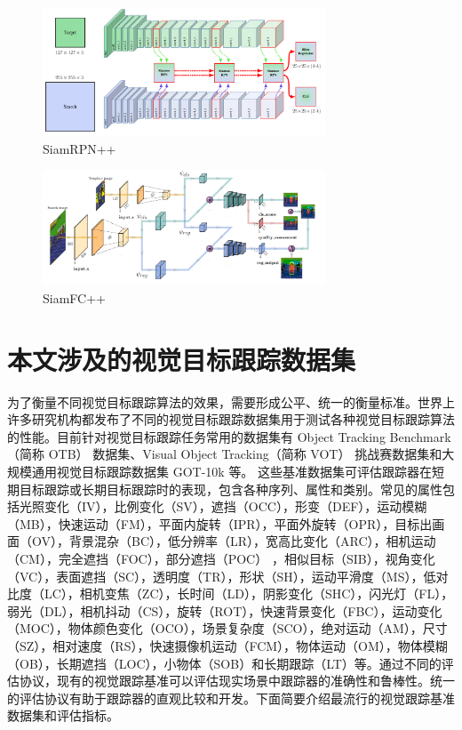\begin{figure}
\centering
\includegraphics[width=0.75\textwidth]{Img/related/SiamRPN++.png}
\caption{SiamRPN++}
\end{figure}

\begin{figure}
\centering
\includegraphics[width=0.75\textwidth]{Img/related/SiamFC++.png}
\caption{SiamFC++}
\end{figure}
\fi
\section{本文涉及的视觉目标跟踪数据集}
为了衡量不同视觉目标跟踪算法的效果，需要形成公平、统一的衡量标准。世界上许多研究机构都发布了不同的视觉目标跟踪数据集用于测试各种视觉目标跟踪算法的性能。目前针对视觉目标跟踪任务常用的数据集有 Object Tracking Benchmark（简称 OTB）\cite{OTB} 数据集、Visual Object Tracking（简称 VOT）\cite{VOT2015} 挑战赛数据集和大规模通用视觉目标跟踪数据集 GOT-10k \cite{GOT-10k} 等。
这些基准数据集可评估跟踪器在短期目标跟踪或长期目标跟踪时的表现，包含各种序列、属性和类别。常见的属性包括光照变化（IV），比例变化（SV），遮挡（OCC），形变（DEF），运动模糊（MB），快速运动（FM），平面内旋转（IPR），平面外旋转（OPR），目标出画面（OV），背景混杂（BC），低分辨率（LR），宽高比变化（ARC），相机运动（CM），完全遮挡（FOC），部分遮挡（POC） ，相似目标（SIB），视角变化（VC），表面遮挡（SC），透明度（TR），形状（SH），运动平滑度（MS），低对比度（LC），相机变焦（ZC），长时间（LD），阴影变化（SHC），闪光灯（FL），弱光（DL），相机抖动（CS），旋转（ROT），快速背景变化（FBC），运动变化（MOC），物体颜色变化（OCO），场景复杂度（SCO），绝对运动（AM），尺寸（SZ），相对速度（RS），快速摄像机运动（FCM），物体运动（OM），物体模糊（OB），长期遮挡（LOC），小物体（SOB）和长期跟踪（LT）等。通过不同的评估协议，现有的视觉跟踪基准可以评估现实场景中跟踪器的准确性和鲁棒性。统一的评估协议有助于跟踪器的直观比较和开发。下面简要介绍最流行的视觉跟踪基准数据集和评估指标。
